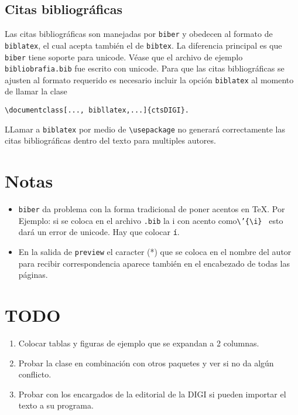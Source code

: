 \documentclass{article}
\begin{document}
\subsection{Citas bibliográficas}
Las citas bibliográficas son manejadas por \texttt{biber} y obedecen al formato de \texttt{biblatex}, el cual acepta también el de \texttt{bibtex}. La diferencia principal es que \texttt{biber} tiene soporte para unicode. Véase que el archivo de ejemplo \texttt{bibliobrafia.bib} fue escrito con unicode. Para que las citas bibliográficas se ajusten al formato requerido es necesario incluir la opción \texttt{biblatex} al momento de llamar la clase
\begin{verbatim}
\documentclass[..., bibllatex,...]{ctsDIGI}.
\end{verbatim}
LLamar a \texttt{biblatex} por medio de \texttt{\textbackslash usepackage} no generará correctamente las citas bibliográficas dentro del texto para multiples autores.


\section{Notas}
\begin{itemize}

\item \texttt{biber} da problema con la forma tradicional de poner acentos en \TeX. Por Ejemplo: si se coloca en el archivo \texttt{.bib} la i con acento como\texttt{\textbackslash'\{\textbackslash i\} } esto dará un error de unicode. Hay que colocar \texttt{í}.

\item En la salida de \texttt{preview} el caracter (*) que se coloca en el nombre del autor para recibir correspondencia aparece también en el encabezado de todas las páginas.

\end{itemize}

\section{TODO}
\begin{enumerate}
\item Colocar tablas y figuras de ejemplo que se expandan a 2 columnas.
\item Probar la clase en combinación con otros paquetes y ver si no da algún conflicto.
\item Probar con los encargados de la editorial de la DIGI si pueden importar el texto a su programa.
\end{enumerate}




 
\end{document}
